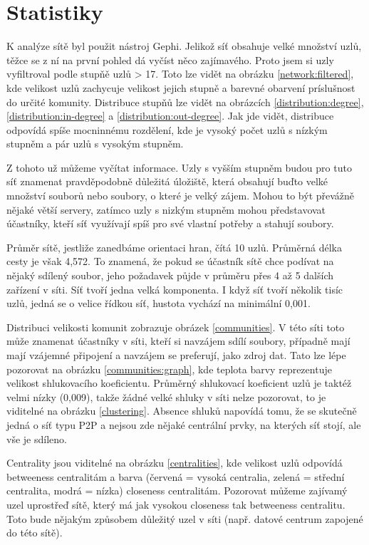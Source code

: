 \documentclass[A4]{article}
\begin{document}
\section{Statistiky}
K analýze sítě byl použit nástroj Gephi. Jelikož síť obsahuje velké množství uzlů, těžce se z ní na první pohled dá vyčíst něco zajímavého.
Proto jsem si uzly vyfiltroval podle stupňě uzlů > 17. Toto lze vidět na obrázku \ref{network:filtered}, kde velikost uzlů zachycuje velikost jejich stupně
a barevné obarvení príslušnost do určité komunity.
Distribuce stupňů lze vidět na obrázcích \ref{distribution:degree}, \ref{distribution:in-degree} a \ref{distribution:out-degree}. Jak jde vidět, distribuce
odpovídá spíše mocninnému rozdělení, kde je vysoký počet uzlů s nízkým stupněm a pár uzlů s vysokým stupněm.

Z tohoto už můžeme vyčítat informace. Uzly s vyšším stupněm budou pro tuto síť znamenat pravděpodobně důležitá úložiště, která obsahují buďto velké množství souborů
nebo soubory, o které je velký zájem. Mohou to být převážně nějaké větší servery, zatímco uzly s nizkým stupněm mohou představovat účastníky, kteří síť využívají
spíš pro své vlastní potřeby a stahují soubory.

Průměr sítě, jestliže zanedbáme orientaci hran, čítá 10 uzlů. Průměrná délka cesty je však 4,572. To znamená, že pokud se účastník sítě chce podívat na nějaký sdílený soubor,
jeho požadavek půjde v průměru přes 4 až 5 dalších zařízení v síti. Síť tvoří jedna velká komponenta. I když síť tvoří několik tisíc uzlů, jedná se o 
velice řídkou síť, hustota vychází na minimální 0,001.

Distribuci velikosti komunit zobrazuje obrázek \ref{communities}. V této síti toto může znamenat účastníky v síti, kteří si navzájem sdílí soubory, případně mají
mají vzájemné připojení a navzájem se preferují, jako zdroj dat. Tato lze lépe pozorovat na obrázku \ref{communities:graph}, kde teplota barvy reprezentuje velikost
shlukovacího koeficientu.
Průměrný shlukovací koeficient uzlů je taktéž velmi nízky (0,009), takže žádné velké shluky v síti nelze pozorovat, to je viditelné na obrázku \ref{clustering}.
Absence shluků napovídá tomu, že se skutečně jedná o síť typu P2P a nejsou zde nějaké centrální prvky, na kterých síť stojí, ale vše je sdíleno.

Centrality jsou viditelné na obrázku \ref{centralities}, kde velikost uzlů odpovídá betweeness centralitám a barva
(červená = vysoká centralia, zelená = střední centralita, modrá = nízka) closeness centralitám. Pozorovat můžeme zajívamý uzel uprostřeď sítě, který má
jak vysokou closeness tak betweeness centralitu. Toto bude nějakým způsobem důležitý uzel v síti (např. datové centrum zapojené do této sítě).
\end{document}

